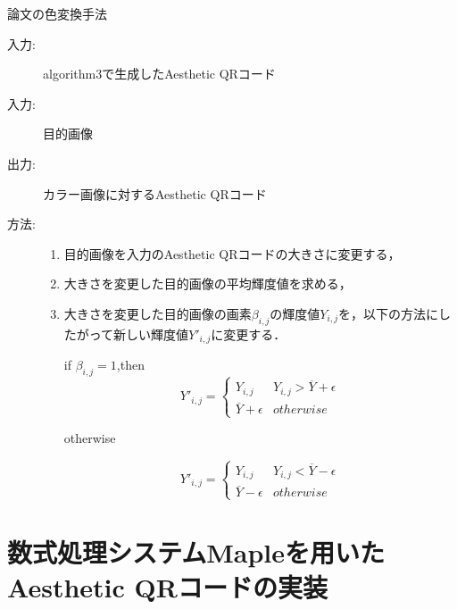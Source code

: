 \documentclass{thesis}
\begin{document}
\begin{algorithm}                      
\caption{論文\cite{KURI}の色変換手法}         
\label{alg:alg4} 
\begin{description}
\item[入力:] algorithm3で生成したAesthetic QRコード
\item[入力:] 目的画像
\item[出力:] カラー画像に対するAesthetic QRコード
\item[方法:]
\begin{enumerate}
\item
目的画像を入力のAesthetic QRコードの大きさに変更する，
\item
大きさを変更した目的画像の平均輝度値を求める，
\item
大きさを変更した目的画像の画素$\beta_{i,j}$の輝度値$Y_{i,j}$を，以下の方法にしたがって新しい輝度値$Y'_{i,j}$に変更する．

if $\beta_{i,j} = 1$,then
\begin{equation}
{Y'_{i,j} = }
\begin{cases}
Y_{i,j} & Y_{i,j} > \overline{Y}+\epsilon \\
\overline{Y}+\epsilon & otherwise 
\end{cases}
\end{equation}

otherwise

\begin{equation}
{Y'_{i,j} = }
\begin{cases}
Y_{i,j} & Y_{i,j} < \overline{Y}-\epsilon \\
\overline{Y}-\epsilon & otherwise 
\end{cases}
\end{equation}

\end{enumerate}
\end{description}
\end{algorithm} 


\chapter{数式処理システムMapleを用いたAesthetic QRコードの実装}
\label{chap:4}
\end{document}
